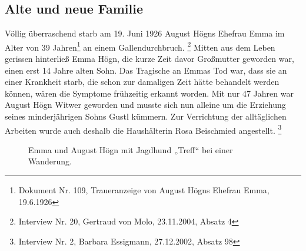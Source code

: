 \subsection{Alte und neue Familie}

Völlig überraschend starb am 19. Juni 1926 August Högns Ehefrau Emma im
Alter von 39 Jahren\footnote{ Dokument Nr. 109, Traueranzeige von August
Högns Ehefrau Emma, 19.6.1926} an einem Gallendurchbruch.
\footnote{Interview Nr. 20, Gertraud von Molo, 23.11.2004, Absatz 4}
Mitten aus dem Leben gerissen hinterließ Emma Högn, die kurze Zeit davor
Großmutter geworden war, einen erst 14 Jahre alten Sohn. Das Tragische
an Emmas Tod war, dass sie an einer Krankheit starb, die schon zur
damaligen Zeit hätte behandelt werden können, wären die Symptome
frühzeitig erkannt worden. Mit nur 47 Jahren war August Högn Witwer
geworden und musste sich nun alleine um die Erziehung seines
minderjährigen Sohns Gustl kümmern. Zur Verrichtung der alltäglichen
Arbeiten wurde auch deshalb die Haushälterin Rosa Beischmied angestellt.
\footnote{Interview Nr. 2, Barbara Essigmann, 27.12.2002, Absatz 98}

\begin{figure}
\caption{Emma und August Högn mit Jagdhund „Treff“ bei einer Wanderung.}
\end{figure}

